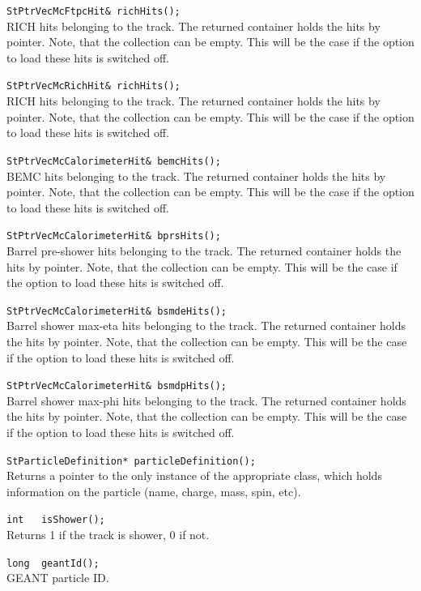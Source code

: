\begin{Entry}
    \verb+StPtrVecMcFtpcHit& richHits();+\\
    RICH hits belonging to the track.
    The returned container holds the
    hits by pointer. Note, that the collection can be empty.
    This will be the case if the option to load these hits is switched off.

    \verb+StPtrVecMcRichHit& richHits();+\\
    RICH hits belonging to the track.
    The returned container holds the
    hits by pointer. Note, that the collection can be empty.
    This will be the case if the option to load these hits is switched off.

    \verb+StPtrVecMcCalorimeterHit& bemcHits();+\\
    BEMC hits belonging to the track.
    The returned container holds the
    hits by pointer. Note, that the collection can be empty.
    This will be the case if the option to load these hits is switched off.

    \verb+StPtrVecMcCalorimeterHit& bprsHits();+\\
    Barrel pre-shower hits belonging to the track.
    The returned container holds the
    hits by pointer. Note, that the collection can be empty.
    This will be the case if the option to load these hits is switched off.

    \verb+StPtrVecMcCalorimeterHit& bsmdeHits();+\\
    Barrel shower max-eta hits belonging to the track.
    The returned container holds the
    hits by pointer. Note, that the collection can be empty.
    This will be the case if the option to load these hits is switched off.

    \verb+StPtrVecMcCalorimeterHit& bsmdpHits();+\\
    Barrel shower max-phi hits belonging to the track.
    The returned container holds the
    hits by pointer. Note, that the collection can be empty.
    This will be the case if the option to load these hits is switched off.

    \verb+StParticleDefinition* particleDefinition();+\\
    Returns a pointer to the only instance of the appropriate
     class, which holds
    information on the particle (name, charge, mass, spin, etc).

    \verb+int   isShower();+\\
    Returns 1 if the track is shower, 0 if not.

    \verb+long  geantId();+\\
    GEANT particle ID.


\end{Entry}
